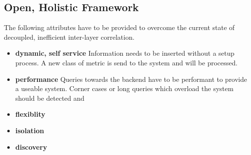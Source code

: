 \subsection{Open, Holistic Framework}
The following attributes have to be provided to overcome the current state of decoupled, inefficient inter-layer correlation.
\begin{itemize}
    \item \textbf{dynamic, self service} Information needs to be inserted without a setup process. A new class of metric is send to the system and will be processed.
    \item \textbf{performance} Queries towards the backend have to be performant to provide a useable system. Corner cases or long queries which overload the system should be detected and 
    \item \textbf{flexiblity}
    \item \textbf{isolation}
    \item \textbf{discovery}
\end{itemize}